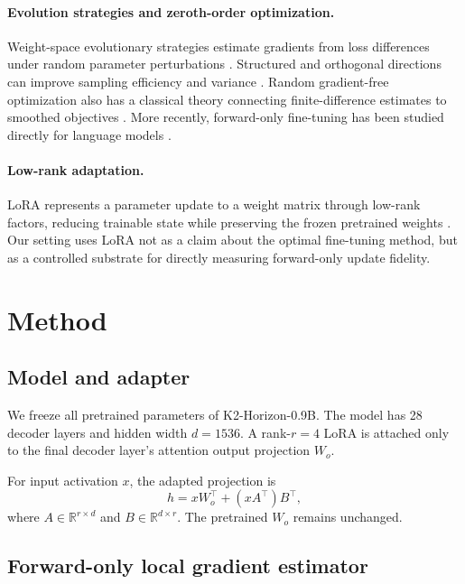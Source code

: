 \documentclass[11pt]{article}
\newcommand{\kmodel}{K2-Horizon-0.9B}
\begin{document}
\paragraph{Evolution strategies and zeroth-order optimization.}
Weight-space evolutionary strategies estimate gradients from loss differences
under random parameter perturbations \citep{salimans2017es}. Structured and
orthogonal directions can improve sampling efficiency and variance
\citep{choromanski2018structured}. Random gradient-free optimization also has
a classical theory connecting finite-difference estimates to smoothed
objectives \citep{nesterov2017random}. More recently, forward-only
fine-tuning has been studied directly for language models
\citep{malladi2023zo}.

\paragraph{Low-rank adaptation.}
LoRA represents a parameter update to a weight matrix through low-rank factors,
reducing trainable state while preserving the frozen pretrained weights
\citep{hu2021lora}. Our setting uses LoRA not as a claim about the optimal
fine-tuning method, but as a controlled substrate for directly measuring
forward-only update fidelity.

\section{Method}

\subsection{Model and adapter}

We freeze all pretrained parameters of \kmodel{}. The model has 28 decoder
layers and hidden width $d=1536$. A rank-$r=4$ LoRA is attached only to the
final decoder layer's attention output projection $W_o$.

For input activation $x$, the adapted projection is
\begin{equation}
    h = x W_o^\top + (x A^\top) B^\top,
\end{equation}
where $A \in \mathbb{R}^{r\times d}$ and
$B \in \mathbb{R}^{d\times r}$. The pretrained $W_o$ remains unchanged.

\subsection{Forward-only local gradient estimator}
\end{document}
